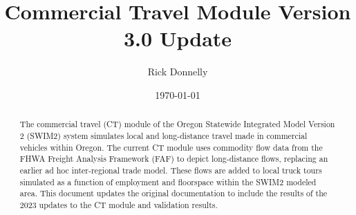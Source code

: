 \documentclass[10pt]{article}
\title{Commercial Travel Module Version 3.0 Update}
\author{Rick Donnelly}
\date{\today}
\begin{document}
\raggedbottom
\newcommand{\gray}{\rowcolor[gray]{.95}}
\setlength\extrarowheight{2pt}
\fontsize{11.75}{14.25}\rm
\setlength{\bibsep}{0pt}


\newcommand{\gls}{}

\maketitle

\begin{abstract}
\normalsize 
\noindent The commercial travel (CT) module of the Oregon Statewide Integrated Model Version 2 (SWIM2) system simulates local and long-distance travel made in commercial vehicles within Oregon. The current CT module uses commodity flow data from the FHWA Freight Analysis Framework (FAF) to depict long-distance flows, replacing an earlier ad hoc inter-regional trade model. These flows are added to local truck tours simulated as a function of employment and floorspace within the SWIM2 modeled area. This document updates the original documentation to include the results of the 2023 updates to the CT module and validation results. 
\end{abstract}

\tableofcontents
\listoffigures
\listoftables




\end{document}
